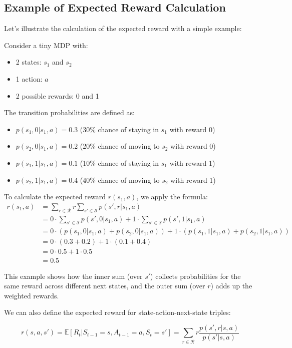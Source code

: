 \documentclass[12pt,a4paper]{article}
\begin{document}
\subsection{Example of Expected Reward Calculation}

Let's illustrate the calculation of the expected reward with a simple example:

Consider a tiny MDP with:
\begin{itemize}
    \item 2 states: $s_1$ and $s_2$
    \item 1 action: $a$
    \item 2 possible rewards: 0 and 1
\end{itemize}

The transition probabilities are defined as:
\begin{itemize}
    \item $p(s_1, 0|s_1, a) = 0.3$ (30\% chance of staying in $s_1$ with reward 0)
    \item $p(s_2, 0|s_1, a) = 0.2$ (20\% chance of moving to $s_2$ with reward 0)
    \item $p(s_1, 1|s_1, a) = 0.1$ (10\% chance of staying in $s_1$ with reward 1)
    \item $p(s_2, 1|s_1, a) = 0.4$ (40\% chance of moving to $s_2$ with reward 1)
\end{itemize}

To calculate the expected reward $r(s_1, a)$, we apply the formula:
\begin{align*}
r(s_1, a) &= \sum_{r \in \mathcal{R}} r \sum_{s' \in \mathcal{S}} p(s', r|s_1, a) \\
&= 0 \cdot \sum_{s' \in \mathcal{S}} p(s', 0|s_1, a) + 1 \cdot \sum_{s' \in \mathcal{S}} p(s', 1|s_1, a) \\
&= 0 \cdot (p(s_1, 0|s_1, a) + p(s_2, 0|s_1, a)) + 1 \cdot (p(s_1, 1|s_1, a) + p(s_2, 1|s_1, a)) \\
&= 0 \cdot (0.3 + 0.2) + 1 \cdot (0.1 + 0.4) \\
&= 0 \cdot 0.5 + 1 \cdot 0.5 \\
&= 0.5
\end{align*}

This example shows how the inner sum (over $s'$) collects probabilities for the same reward across different next states, and the outer sum (over $r$) adds up the weighted rewards.

We can also define the expected reward for state-action-next-state triples:

\begin{equation}
r(s,a,s') = \mathbb{E}[R_t|S_{t-1}=s, A_{t-1}=a, S_t=s'] = \sum_{r \in \mathcal{R}} r \frac{p(s',r|s,a)}{p(s'|s,a)}
\end{equation}
\end{document}
